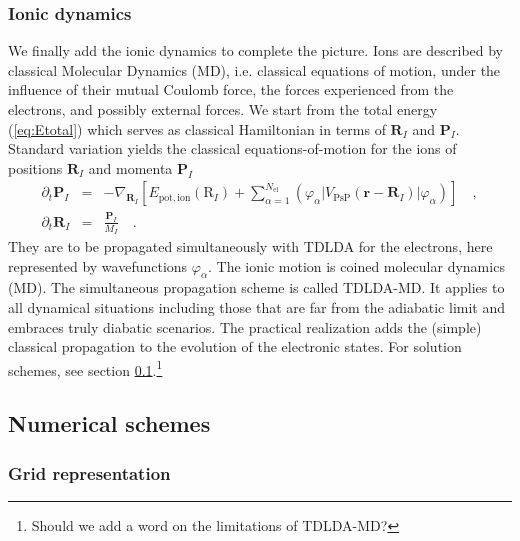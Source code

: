 \documentclass[final,1p]{elsarticle}
\newcommand{\PGRfoot}[1]{{\color{blue}\footnote{\color{blue} #1}}}
\begin{document}
\subsubsection{Ionic dynamics}
\label{sec:TDLDA-MD2}



We finally add the ionic dynamics to complete the picture. Ions are
described by classical Molecular Dynamics (MD), i.e.  classical
equations of motion, under the influence of their mutual Coulomb
force, the forces experienced from the electrons, and possibly
external forces.  We start from the total energy (\ref{eq:Etotal})
which serves as classical Hamiltonian in terms of $\mathbf{R}_I$ and
$\mathbf{P}_I$. Standard variation yields the classical
equations-of-motion for the ions of positions $\mathbf{R}_I$ and
momenta $\mathbf{P}_I$
\begin{subequations}
\label{eq:propion}
\begin{eqnarray}
  \partial_t\mathbf{P}_I
  &=&
  -\nabla_{\mathbf{R}_I}\left[
    E_\mathrm{pot,ion}(\mathrm{R}_I)
    +
    \sum_{\alpha=1}^{N_\mathrm{el}}
    \left(\varphi_\alpha|V_\mathrm{PsP}^{\mbox{}}(\mathbf{r}-\mathbf{R}_I)|
          \varphi_\alpha\right)
  \right]
  \quad,
\label{eq:propionP}
\\
  \partial_t\mathbf{R}_I
  &=&
  \frac{\mathbf{P}_I}{M_I}
  \quad.
\end{eqnarray}
\end{subequations}
They are to be propagated simultaneously with TDLDA for the electrons, here
represented by wavefunctions $\varphi_\alpha$.
The ionic motion is coined molecular dynamics (MD).
The simultaneous propagation scheme is called TDLDA-MD.
It applies to all dynamical situations including those that are
far from the adiabatic limit and embraces truly diabatic scenarios.
The practical realization adds the (simple) classical propagation
to the evolution of the electronic states. For solution schemes, see
section \ref{sec:numerics}.\PGRfoot{Should we add a word on the
limitations of TDLDA-MD?}


\subsection{Numerical schemes}
\label{sec:numerics}

\subsubsection{Grid representation}
\label{sec:grid}
\end{document}
